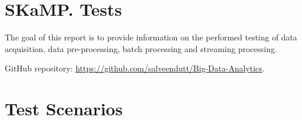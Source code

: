\documentclass[12pt,a4paper, hidelinks]{article}
\begin{document}
\section*{SKaMP. Tests}
\vspace{\baselineskip} %

The goal of this report is to provide information on the performed testing of data acquisition, data pre-processing, batch processing and streaming processing.

GitHub repository: \href{https://github.com/salveendutt/Big-Data-Analytics}{https://github.com/salveendutt/Big-Data-Analytics}.

\section{Test Scenarios}
\end{document}
